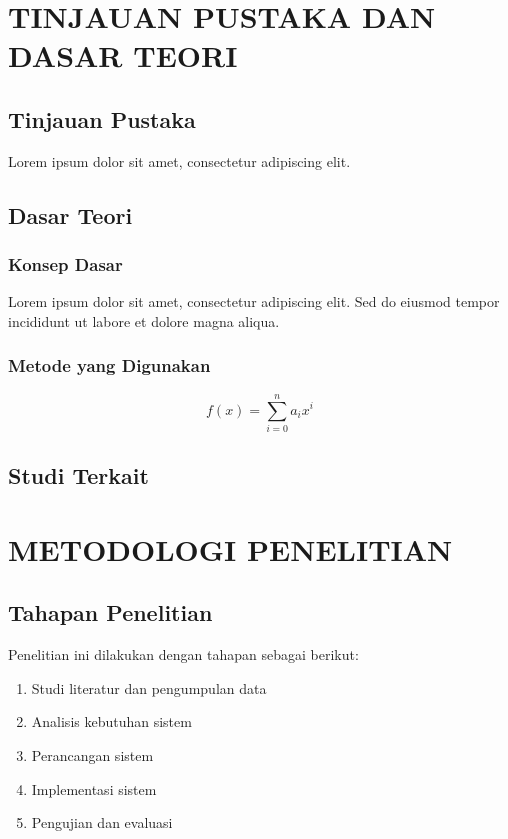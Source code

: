 \documentclass[12pt,a4paper,oneside]{book}
\begin{document}
\chapter{TINJAUAN PUSTAKA DAN DASAR TEORI}

\section{Tinjauan Pustaka}
Lorem ipsum dolor sit amet, consectetur adipiscing elit.

\section{Dasar Teori}

\subsection{Konsep Dasar}
Lorem ipsum dolor sit amet, consectetur adipiscing elit. Sed do eiusmod tempor incididunt ut labore et dolore magna aliqua.

\subsection{Metode yang Digunakan}
\lipsum[2]

\begin{equation}
    f(x) = \sum_{i=0}^{n} a_i x^i
    \label{eq:polynomial}
\end{equation}

\section{Studi Terkait}
\lipsum[3]

\chapter{METODOLOGI PENELITIAN}

\section{Tahapan Penelitian}
Penelitian ini dilakukan dengan tahapan sebagai berikut:

\begin{enumerate}
    \item Studi literatur dan pengumpulan data
    \item Analisis kebutuhan sistem
    \item Perancangan sistem
    \item Implementasi sistem
    \item Pengujian dan evaluasi
\end{enumerate}
\end{document}
